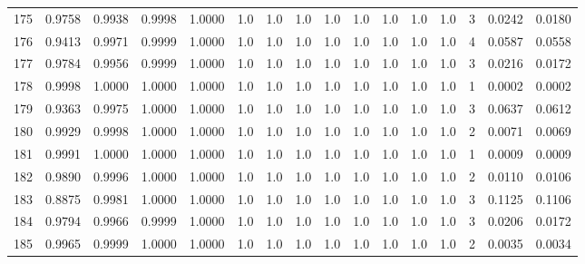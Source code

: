 \begin{tabular}{lrrrrrrrrrrrrrrr}
175 &      0.9758 &  0.9938 &  0.9998 &  1.0000 &     1.0 &     1.0 &     1.0 &     1.0 &     1.0 &     1.0 &      1.0 &        1.0 &      3 &                    0.0242 &                     0.0180 \\
176 &      0.9413 &  0.9971 &  0.9999 &  1.0000 &     1.0 &     1.0 &     1.0 &     1.0 &     1.0 &     1.0 &      1.0 &        1.0 &      4 &                    0.0587 &                     0.0558 \\
177 &      0.9784 &  0.9956 &  0.9999 &  1.0000 &     1.0 &     1.0 &     1.0 &     1.0 &     1.0 &     1.0 &      1.0 &        1.0 &      3 &                    0.0216 &                     0.0172 \\
178 &      0.9998 &  1.0000 &  1.0000 &  1.0000 &     1.0 &     1.0 &     1.0 &     1.0 &     1.0 &     1.0 &      1.0 &        1.0 &      1 &                    0.0002 &                     0.0002 \\
179 &      0.9363 &  0.9975 &  1.0000 &  1.0000 &     1.0 &     1.0 &     1.0 &     1.0 &     1.0 &     1.0 &      1.0 &        1.0 &      3 &                    0.0637 &                     0.0612 \\
180 &      0.9929 &  0.9998 &  1.0000 &  1.0000 &     1.0 &     1.0 &     1.0 &     1.0 &     1.0 &     1.0 &      1.0 &        1.0 &      2 &                    0.0071 &                     0.0069 \\
181 &      0.9991 &  1.0000 &  1.0000 &  1.0000 &     1.0 &     1.0 &     1.0 &     1.0 &     1.0 &     1.0 &      1.0 &        1.0 &      1 &                    0.0009 &                     0.0009 \\
182 &      0.9890 &  0.9996 &  1.0000 &  1.0000 &     1.0 &     1.0 &     1.0 &     1.0 &     1.0 &     1.0 &      1.0 &        1.0 &      2 &                    0.0110 &                     0.0106 \\
183 &      0.8875 &  0.9981 &  1.0000 &  1.0000 &     1.0 &     1.0 &     1.0 &     1.0 &     1.0 &     1.0 &      1.0 &        1.0 &      3 &                    0.1125 &                     0.1106 \\
184 &      0.9794 &  0.9966 &  0.9999 &  1.0000 &     1.0 &     1.0 &     1.0 &     1.0 &     1.0 &     1.0 &      1.0 &        1.0 &      3 &                    0.0206 &                     0.0172 \\
185 &      0.9965 &  0.9999 &  1.0000 &  1.0000 &     1.0 &     1.0 &     1.0 &     1.0 &     1.0 &     1.0 &      1.0 &        1.0 &      2 &                    0.0035 &                     0.0034 \\

\end{tabular}
